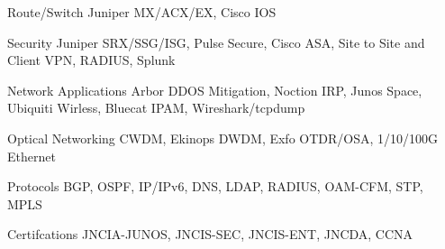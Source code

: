 


\begin{cvskills}


\cvskill
{Route/Switch}
{Juniper MX/ACX/EX, Cisco IOS}


\cvskill
{Security}
{Juniper SRX/SSG/ISG, Pulse Secure, Cisco ASA, Site to Site and Client VPN, RADIUS, Splunk}


\cvskill
{Network Applications}
{Arbor DDOS Mitigation, Noction IRP, Junos Space, Ubiquiti Wirless, Bluecat IPAM, Wireshark/tcpdump}


\cvskill
{Optical Networking}
{CWDM, Ekinops DWDM, Exfo OTDR/OSA, 1/10/100G Ethernet}


\cvskill
{Protocols}
{BGP, OSPF, IP/IPv6, DNS, LDAP, RADIUS, OAM-CFM, STP, MPLS}


\cvskill
{Certifcations}
{JNCIA-JUNOS, JNCIS-SEC, JNCIS-ENT, JNCDA, CCNA}

\end{cvskills}
